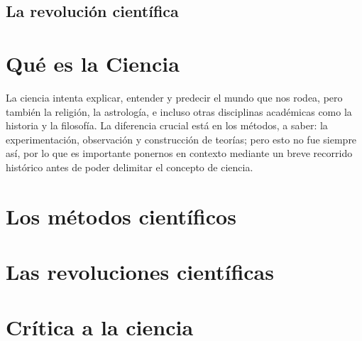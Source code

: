 \subsection*{La revolución científica}
\label{sub:larevolucioncientifica}



\section{Qué es la Ciencia}
\label{sec:queeslaciencia}

La ciencia intenta explicar, entender y predecir el mundo que nos rodea, pero
también la religión, la astrología, e incluso otras disciplinas académicas como
la historia y la filosofía.
La diferencia crucial está en los métodos, a saber: la experimentación,
observación y construcción de teorías; pero esto no fue siempre así, por lo que
es importante ponernos en contexto mediante un breve recorrido histórico antes
de poder delimitar el concepto de ciencia.

\section{Los métodos científicos}
\label{sec:losmetodoscientificos}

\section{Las revoluciones científicas}
\label{sec:lasrevolucionescientificas}

\section{Crítica a la ciencia}
\label{sec:criticaalaciencia}
